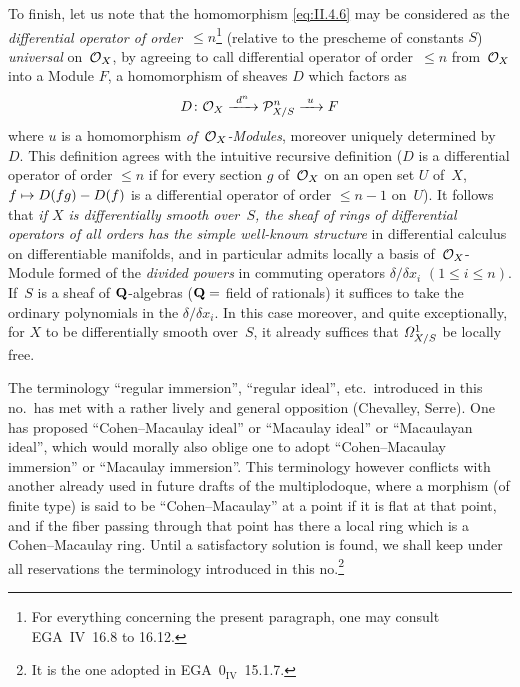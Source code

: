 \begin{remarks}
To finish, let us note that the homomorphism \eqref{eq:II.4.6} may be
considered as the \emph{differential operator
of order}~$\leq n$\footnote{For everything concerning the present
paragraph, one may consult EGA~IV~16.8 to 16.12.}
(relative to the prescheme of constants $S$)
\emph{universal}
on~$\cal{O}_X$, by agreeing to call differential operator
of order~$\leq n$
from~$\cal{O}_X$ into a Module $F$, a homomorphism of sheaves $D$
which factors as
\[
D\colon \cal{O}_X\lto{d^n} \cal{P}_{X/S}^n\lto{u} F
\]
where $u$ is a homomorphism \emph{of~$\cal{O}_X$-Modules},
moreover uniquely determined by~$D$. This definition
agrees with the intuitive recursive definition ($D$ is a
differential operator of order $\leq n$ if for every section
$g$ of~$\cal{O}_X$ on an open set $U$ of~$X$, $f\mto D(fg)-D(f)$ is
a differential operator of order $\leq n-1$ on~$U$). It
follows that \emph{if $X$ is differentially smooth over~$S$, the
sheaf of rings of differential operators of all orders
has the simple well-known structure} in differential calculus on
differentiable manifolds, and in particular admits
locally a basis of~$\cal{O}_X$-Module
formed of the \emph{divided powers} in commuting operators
$\delta/\delta x_i$ $(1\leq i\leq n)$. If~$S$ is a sheaf of
$\QQ$-algebras ($\QQ=$ field of rationals) it suffices to take
the ordinary polynomials in the $\delta/\delta x_i$. In this case
moreover, and quite exceptionally, for $X$ to be
differentially smooth over~$S$, it already suffices that
$\it{\Omega}_{X/S}^1$ be locally free.
\end{remarks}
\endgroup

\begin{remark}
\label{II.4.19}
The terminology ``regular immersion'', ``regular
ideal'', etc.\ introduced in this no.\ has met with
a rather lively and general opposition (Chevalley, Serre). One has
proposed ``Cohen--Macaulay ideal'' or ``Macaulay
ideal'' or ``Macaulayan ideal'', which would morally also oblige
one to adopt ``Cohen--Macaulay immersion'' or ``Macaulay
immersion''. This terminology however conflicts with another
already used in future drafts of the
multiplodoque, where a morphism (of finite type) is said to be
``Cohen--Macaulay'' at a point if it is flat at that point, and if the
fiber passing through that point has there a local ring which is a
Cohen--Macaulay ring. Until a satisfactory solution is found,
we shall keep under all reservations the terminology introduced
in this no.\footnote{It is the one adopted in
EGA~$\mathrm{0}_\mathrm{IV}$~15.1.7.}
\end{remark}
